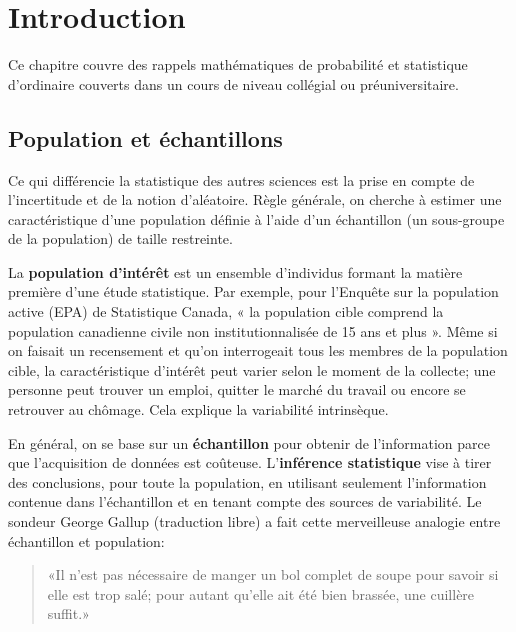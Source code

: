 \documentclass[
  11pt,
  letterpaper,
]{scrbook}
\theoremstyle{plain}
\theoremstyle{plain}
\theoremstyle{definition}
\theoremstyle{definition}
\theoremstyle{remark}
\begin{document}

\chapter{Introduction}\label{intro}

Ce chapitre couvre des rappels mathématiques de probabilité et
statistique d'ordinaire couverts dans un cours de niveau collégial ou
préuniversitaire.

\section{Population et échantillons}\label{population-echantillon}

Ce qui différencie la statistique des autres sciences est la prise en
compte de l'incertitude et de la notion d'aléatoire. Règle générale, on
cherche à estimer une caractéristique d'une population définie à l'aide
d'un échantillon (un sous-groupe de la population) de taille restreinte.

La \textbf{population d'intérêt} est un ensemble d'individus formant la
matière première d'une étude statistique. Par exemple, pour l'Enquête
sur la population active (EPA) de Statistique Canada, « la population
cible comprend la population canadienne civile non institutionnalisée de
15 ans et plus ». Même si on faisait un recensement et qu'on
interrogeait tous les membres de la population cible, la caractéristique
d'intérêt peut varier selon le moment de la collecte; une personne peut
trouver un emploi, quitter le marché du travail ou encore se retrouver
au chômage. Cela explique la variabilité intrinsèque.

En général, on se base sur un \textbf{échantillon} pour obtenir de
l'information parce que l'acquisition de données est coûteuse.
L'\textbf{inférence statistique} vise à tirer des conclusions, pour
toute la population, en utilisant seulement l'information contenue dans
l'échantillon et en tenant compte des sources de variabilité. Le sondeur
George Gallup (traduction libre) a fait cette merveilleuse analogie
entre échantillon et population:

\begin{quote}
«Il n'est pas nécessaire de manger un bol complet de soupe pour savoir
si elle est trop salé; pour autant qu'elle ait été bien brassée, une
cuillère suffit.»
\end{quote}
\end{document}
